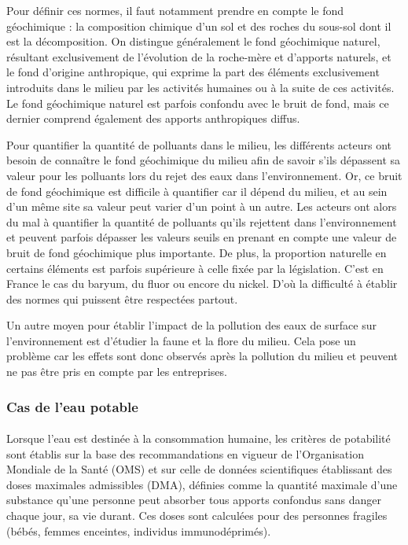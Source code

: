 \documentclass{article}
\begin{document}
Pour définir ces normes, il faut notamment prendre en compte le fond géochimique : la composition chimique d'un sol et des roches du sous-sol dont il est la décomposition. On distingue généralement le fond géochimique naturel, résultant exclusivement de l'évolution de la roche-mère et d'apports naturels, et le fond d'origine anthropique, qui exprime la part des éléments exclusivement introduits dans le milieu par les activités humaines ou à la suite de ces activités. Le fond géochimique naturel est parfois confondu avec le  bruit de fond, mais ce dernier comprend également des apports anthropiques diffus.

Pour quantifier la quantité de polluants dans le milieu, les différents acteurs ont besoin de connaître le fond géochimique du milieu afin de savoir s’ils dépassent sa valeur pour les polluants lors du rejet des eaux dans l’environnement. Or, ce bruit de fond géochimique est difficile à quantifier car il dépend du milieu, et au sein d’un même site sa valeur peut varier d’un point à un autre. Les acteurs ont alors du mal à quantifier la quantité de polluants qu’ils rejettent dans l’environnement et peuvent parfois dépasser les valeurs seuils en prenant en compte une valeur de bruit de fond géochimique plus importante. De plus, la proportion naturelle en certains éléments est parfois supérieure à celle fixée par la législation. C’est en France le cas du baryum, du fluor ou encore du nickel. D’où la difficulté à établir des normes qui puissent être respectées partout. 

Un autre moyen pour établir l’impact de la pollution des eaux de surface sur l’environnement est d’étudier la faune et la flore du milieu. Cela pose un problème car les effets sont donc observés après la pollution du milieu et peuvent ne pas être pris en compte par les entreprises. 

\subsubsection{Cas de l’eau potable} 

\paragraph{} Lorsque l’eau est destinée à la consommation humaine, les critères de potabilité sont établis sur la base des recommandations en vigueur de l’Organisation Mondiale de la Santé (OMS) et sur celle de données scientifiques établissant des doses maximales admissibles (DMA), définies comme la quantité maximale d’une substance qu’une personne peut absorber tous apports confondus sans danger chaque jour, sa vie durant. Ces doses sont calculées pour des personnes fragiles (bébés, femmes enceintes, individus immunodéprimés).
\end{document}
